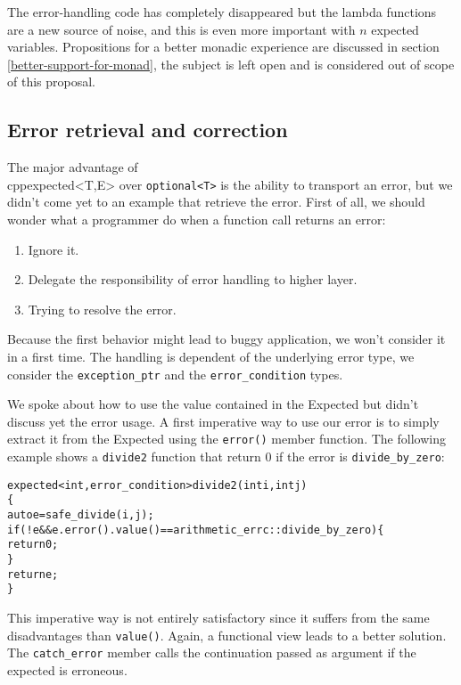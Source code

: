 \documentclass[a4paper,10pt]{article}
\newcommand{\cpp}[1]{\lstinline{#1}}
\begin{document}
The error-handling code has completely disappeared but the lambda functions are a new source of noise, and this is even more important with $n$ expected variables. Propositions for a better monadic experience are discussed in section \ref{better-support-for-monad}, the subject is left open and is considered out of scope of this proposal.

\subsection{Error retrieval and correction}

The major advantage of \\cpp{expected<T,E>} over \cpp{optional<T>} is the ability to transport an error, but we didn't come yet to an example that retrieve the error. First of all, we should wonder what a programmer do when a function call returns an error:

\begin{enumerate}
 \item Ignore it.
 \item Delegate the responsibility of error handling to higher layer.
 \item Trying to resolve the error.
\end{enumerate}

Because the first behavior might lead to buggy application, we won't consider it in a first time. The handling is dependent of the underlying error type, we consider the \cpp{exception_ptr} and the \cpp{error_condition} types.

We spoke about how to use the value contained in the Expected but didn't discuss yet the error usage. A first imperative way to use our error is to simply extract it from the Expected using the \cpp{error()} member function. The following example shows a \cpp{divide2} function that return 0 if the error is \cpp{divide_by_zero}:

\begin{alltt}
expected<int, error_condition> divide2(int i, int j)
\{
  auto e = safe_divide(i,j);
  if (!e && e.error().value() == arithmetic_errc::divide_by_zero) \{
    return 0;
  \}
  return e;
\}
\end{alltt}

This imperative way is not entirely satisfactory since it suffers from the same disadvantages than \cpp{value()}. Again, a functional view leads to a better solution. The \cpp{catch_error} member calls the continuation passed as argument if the expected is erroneous.
\end{document}
